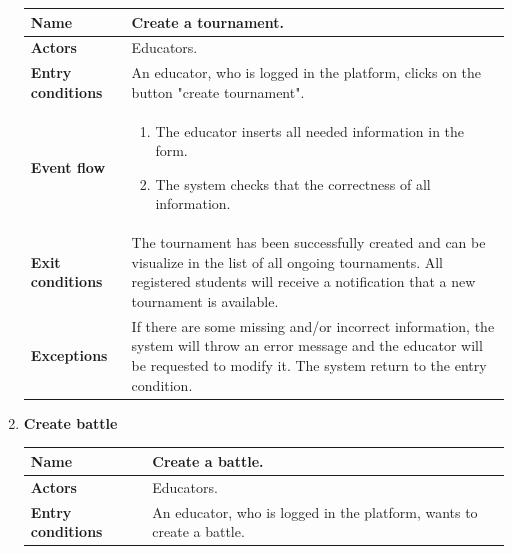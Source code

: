 \begin{enumerate}[label=\textbf{UC.\arabic*}]
\begin{table}[H]
                \renewcommand{\arraystretch}{1.5}
                \begin{tabular}{|m{3.2cm}|m{9.8cm}|}
                    \hline
                    \textbf{Name} & Create a tournament. \\
                    \hline
                    \textbf{Actors} & Educators. \\
                    \hline
                    \textbf{Entry conditions}  & An educator, who is logged in the platform, clicks on the button "create tournament". \\
                    \hline
                    \textbf{Event flow}  &  
                    \begin{enumerate}[label=\arabic*.]
                        \item The educator inserts all needed information in the form.
                        \item The system checks that the correctness of all information.
                    \end{enumerate}\\
                    \hline
                    \textbf{Exit conditions}  & The tournament has been successfully created and can be visualize in the list of all ongoing tournaments. All registered students will receive a notification that a new tournament is available.\\
                    \hline
                    \textbf{Exceptions}  & 
                    If there are some missing and/or incorrect information, the system will throw an error message and the educator will be requested to modify it. The system return to the entry condition. \\
                    \hline 
                \end{tabular}
        \end{table}
        \item {} \textbf{Create battle}
        \begin{table}[H]
    	    \centering
                \renewcommand{\arraystretch}{1.5}
                \begin{tabular}{|m{3.2cm}|m{9.8cm}|}
                    \hline
                    \textbf{Name} & Create a battle. \\
                    \hline
                    \textbf{Actors} & Educators. \\
                    \hline
                    \textbf{Entry conditions}  &  An educator, who is logged in the platform, wants to create a battle.\\

\end{tabular}
\end{table}
\end{enumerate}
